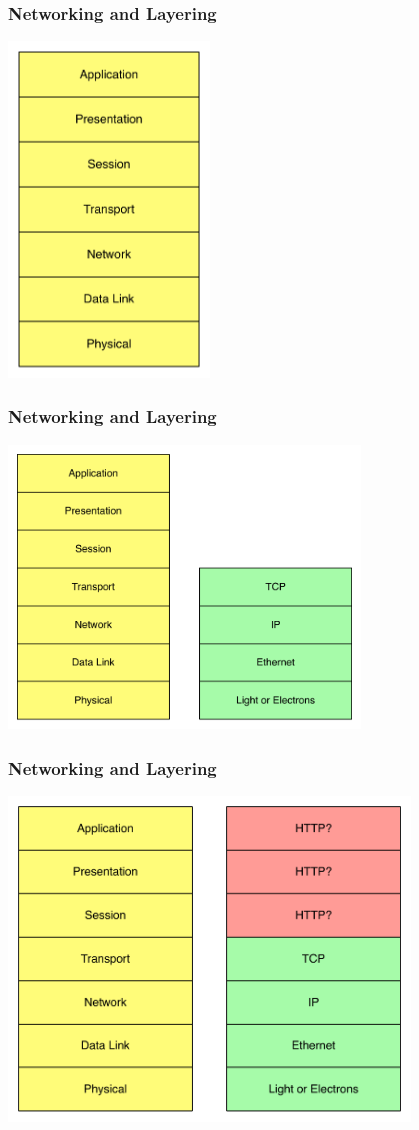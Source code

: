 \documentclass[pdftex]{beamer} %
\begin{document}
\begin{frame}
  \frametitle{Networking and Layering}
\centering
\includegraphics[width=0.4\textwidth]{../../figures/ISO-layers.pdf}
\end{frame}

\begin{frame}
  \frametitle{Networking and Layering}
\centering
\includegraphics[width=0.7\textwidth]{../../figures/ISO-layers-mapped.pdf}
\end{frame}

\begin{frame}
  \frametitle{Networking and Layering}
\centering
\includegraphics[width=0.8\textwidth]{../../figures/ISO-layers-http.pdf}
\end{frame}
\end{document}
